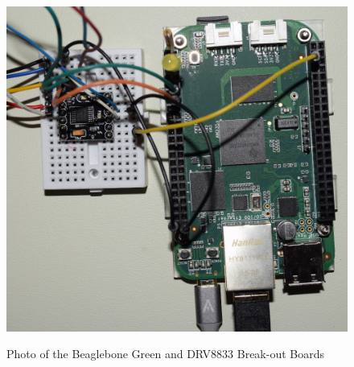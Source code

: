 \begin{figure}[H]
	\centering
	\includegraphics[width=1.0\textwidth]{photos/top_view.jpg}
	\centering\bfseries
	\caption{Photo of the Beaglebone Green and DRV8833 Break-out Boards}
\end{figure}





